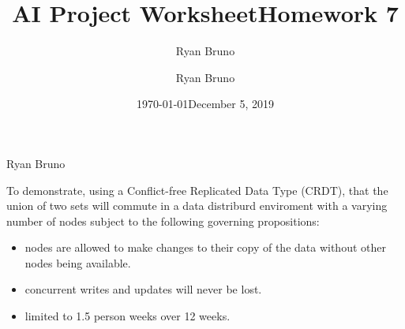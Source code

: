\documentclass{article}
\title{AI Project Worksheet}
\author{Ryan Bruno}
\date{\today}
\title{Homework 7}
\author{Ryan Bruno}
\date{December 5, 2019}
\begin{document}
\Large{Ryan Bruno}

To demonstrate, using a Conflict-free Replicated Data Type (CRDT), that the union of two sets will commute in a data distriburd enviroment with a varying number of nodes subject to the following governing propositions:

\begin{itemize}
\item nodes are allowed to make changes to their copy of the data without other nodes being available.
\item concurrent writes and updates will never be lost.
\item limited to 1.5 person weeks over 12 weeks.
\end{itemize}
\end{document}
